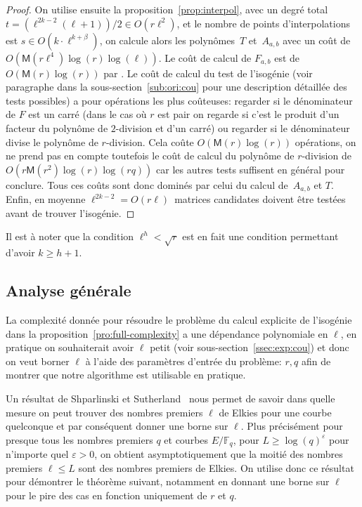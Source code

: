 \documentclass[10pt,a4paper]{book}
\theoremstyle{plain}
\theoremstyle{definition}
\theoremstyle{definition}
\theoremstyle{definition}
\theoremstyle{definition}
\theoremstyle{definition}
\theoremstyle{remark}
\theoremstyle{remark}
\theoremstyle{definition}
\begin{document}
\begin{proof}
  
  On utilise ensuite la proposition~\ref{prop:interpol}, avec un degré total
  ~$t = (\ell^{2k-2}(\ell+1))/2\in O(r\ell^2)$, et le nombre de points d'interpolations
  est $s \in O(k \cdot \ell^{k+\beta})$, on calcule alors les polynômes~$T$
  et~$A_{a,b}$ avec un coût de~$O(\mathsf{M}(r \ell^4)\log(r)\log(\ell))$.  Le coût
  de calcul de $F_{a,b}$ est de $O(\mathsf{M}(r)\log(r))$ par 
  \cite[Théorème 7.5]{algeff17}. Le coût de calcul du test de l'isogénie (voir
  paragraphe dans la sous-section~\ref{sub:ori:cou} pour une description 
  détaillée des tests possibles) a pour opérations 
  les plus coûteuses: regarder si le dénominateur de $F$ est un carré (dans
  le cas où $r$ est pair on regarde si c’est le produit d’un facteur du polynôme de 
  $2$-division et d’un carré) ou regarder si le dénominateur
  divise le polynôme de $r$-division. Cela coûte $O(\mathsf{M}(r)
  \log(r))$ opérations, on ne prend pas en compte toutefois le coût de calcul
   du polynôme de $r$-division  de $O(r\mathsf{M}(r^2)\log(r)\log(r q))$ car 
  les autres tests suffisent en général pour conclure. Tous ces coûts sont donc
  dominés par celui du calcul de~$A_{a,b}$ et $T$.  Enfin, en moyenne 
   ${\ell^{2k-2}=O(r\ell)}$~matrices candidates doivent être testées
   avant de trouver l'isogénie.
\end{proof}
 
  Il est à noter que la condition $\ell^h<\sqrt{r}$ est en fait une condition 
  permettant d'avoir $k \geqslant h+1$.

\subsection{Analyse générale}
\label{sub:cou:ag}
La complexité donnée pour résoudre le problème du calcul explicite de 
l'isogénie dans la proposition~\ref{pro:full-complexity} a une dépendance 
polynomiale en $\ell$, en pratique on souhaiterait avoir $\ell$ petit 
(voir sous-section~\ref{ssec:exp:cou})
et donc on veut borner $\ell$ à l'aide des paramètres d'entrée du problème: $r,q$
afin de montrer que notre algorithme est utilisable en pratique. 

Un résultat de Shparlinski et 
Sutherland~\cite[Theorem~1]{ShparlinskiSutherland14}
nous permet de savoir dans quelle mesure on peut trouver des nombres premiers 
$\ell$ de Elkies pour une courbe quelconque et par conséquent donner une borne sur
 $\ell$. Plus précisément pour presque 
tous les nombres premiers $q$ et courbes $E/\mathbb{F}_q$, pour 
$L\geqslant\log(q)^\varepsilon$ pour n'importe quel $\varepsilon>0$,
on obtient asymptotiquement que la moitié des nombres premiers $\ell \leqslant 
L$ sont des nombres premiers de Elkies.
On utilise donc ce résultat pour démontrer le théorème suivant, notamment en donnant une 
borne sur $\ell$ pour le pire des cas en fonction uniquement de $r$ et $q$.
\end{document}
